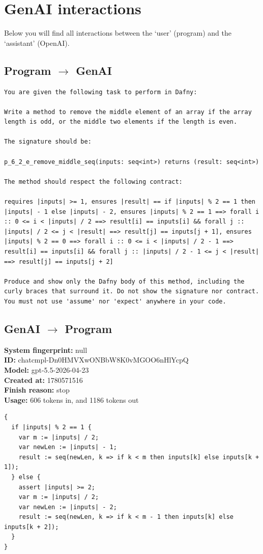 \documentclass{article}
\begin{document}
\section*{GenAI interactions}
Below you will find all interactions between the `user' (program) and the `assistant' (OpenAI).
\subsection*{Program $\rightarrow$ GenAI}
\begin{lstlisting}
You are given the following task to perform in Dafny:

Write a method to remove the middle element of an array if the array length is odd, or the middle two elements if the length is even.

The signature should be:

p_6_2_e_remove_middle_seq(inputs: seq<int>) returns (result: seq<int>)

The method should respect the following contract:

requires |inputs| >= 1, ensures |result| == if |inputs| % 2 == 1 then |inputs| - 1 else |inputs| - 2, ensures |inputs| % 2 == 1 ==> forall i :: 0 <= i < |inputs| / 2 ==> result[i] == inputs[i] && forall j :: |inputs| / 2 <= j < |result| ==> result[j] == inputs[j + 1], ensures |inputs| % 2 == 0 ==> forall i :: 0 <= i < |inputs| / 2 - 1 ==> result[i] == inputs[i] && forall j :: |inputs| / 2 - 1 <= j < |result| ==> result[j] == inputs[j + 2]

Produce and show only the Dafny body of this method, including the curly braces that surround it. Do not show the signature nor contract. You must not use 'assume' nor 'expect' anywhere in your code.
\end{lstlisting}
\subsection*{GenAI $\rightarrow$ Program}
\textbf{System fingerprint: }null
\\\textbf{ID: }chatcmpl-Dn0HMVXwONBbW8K0vMGOO6nHlYcpQ
\\\textbf{Model: }gpt-5.5-2026-04-23
\\\textbf{Created at: }1780571516
\\\textbf{Finish reason: }stop
\\\textbf{Usage: }606 tokens in, and 1186 tokens out
\begin{lstlisting}
{
  if |inputs| % 2 == 1 {
    var m := |inputs| / 2;
    var newLen := |inputs| - 1;
    result := seq(newLen, k => if k < m then inputs[k] else inputs[k + 1]);
  } else {
    assert |inputs| >= 2;
    var m := |inputs| / 2;
    var newLen := |inputs| - 2;
    result := seq(newLen, k => if k < m - 1 then inputs[k] else inputs[k + 2]);
  }
}
\end{lstlisting}
\end{document}
